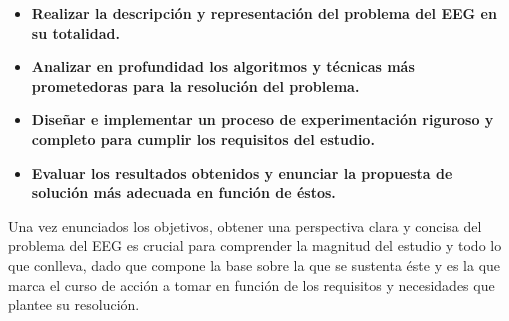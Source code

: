 \begin{itemize}
	\item \textbf{Realizar la descripción y representación del problema del EEG en su totalidad.}
	\item \textbf{Analizar en profundidad los algoritmos y técnicas más prometedoras para la resolución del problema.}
	\item \textbf{Diseñar e implementar un proceso de experimentación riguroso y completo para cumplir los requisitos del estudio.}
	\item \textbf{Evaluar los resultados obtenidos y enunciar la propuesta de solución más adecuada en función de éstos.}
\end{itemize}

Una vez enunciados los objetivos, obtener una perspectiva clara y concisa del problema del EEG es crucial para comprender la magnitud del estudio y todo lo que conlleva, dado que compone la base sobre la que se sustenta éste y es la que marca el curso de acción a tomar en función de los requisitos y necesidades que plantee su resolución. 

